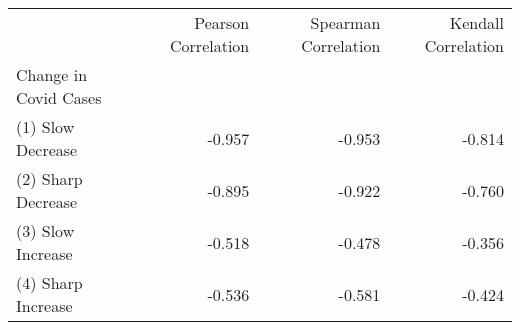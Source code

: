 \begin{tabular}{lrrr}
\toprule
{} &  Pearson Correlation &  Spearman Correlation &  Kendall Correlation \\
Change in Covid Cases &                      &                       &                      \\
\midrule
(1) Slow Decrease     &               -0.957 &                -0.953 &               -0.814 \\
(2) Sharp Decrease    &               -0.895 &                -0.922 &               -0.760 \\
(3) Slow Increase     &               -0.518 &                -0.478 &               -0.356 \\
(4) Sharp Increase    &               -0.536 &                -0.581 &               -0.424 \\
\bottomrule
\end{tabular}
